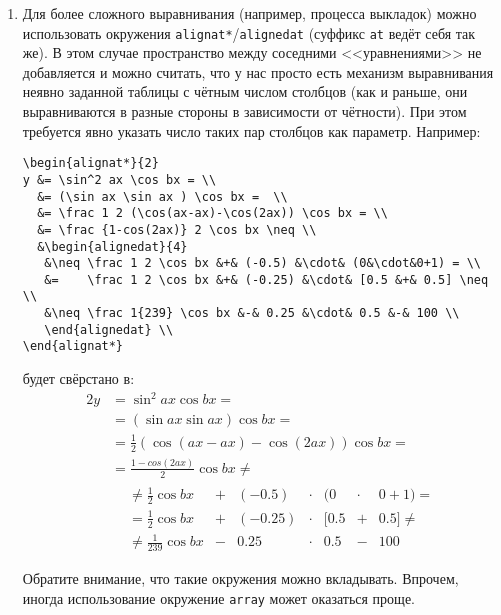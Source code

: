 \documentclass[12pt,a4paper]{book}
\begin{document}
\begin{enumerate}
\item
	Для более сложного выравнивания (например, процесса выкладок) можно использовать
	окружения \texttt{alignat*}/\texttt{alignedat} (суффикс \texttt{at} ведёт себя так же).
	В этом случае пространство между соседними <<уравнениями>> не добавляется и можно
	считать, что у нас просто есть механизм выравнивания неявно заданной таблицы с чётным
	числом столбцов (как и раньше, они выравниваются в разные стороны в зависимости от чётности).
	При этом требуется явно указать число таких пар столбцов как параметр.
	Например:
\begin{verbatim}
\begin{alignat*}{2}
y &= \sin^2 ax \cos bx = \\
  &= (\sin ax \sin ax ) \cos bx =  \\
  &= \frac 1 2 (\cos(ax-ax)-\cos(2ax)) \cos bx = \\
  &= \frac {1-cos(2ax)} 2 \cos bx \neq \\
  &\begin{alignedat}{4}
   &\neq \frac 1 2 \cos bx &+& (-0.5) &\cdot& (0&\cdot&0+1) = \\
   &=    \frac 1 2 \cos bx &+& (-0.25) &\cdot& [0.5 &+& 0.5] \neq \\
   &\neq \frac 1{239} \cos bx &-& 0.25 &\cdot& 0.5 &-& 100 \\
   \end{alignedat} \\
\end{alignat*}
\end{verbatim}
будет свёрстано в:
\begin{alignat*}{2}
y &= \sin^2 ax \cos bx = \\
  &= (\sin ax \sin ax ) \cos bx =  \\
  &= \frac 1 2 (\cos(ax-ax)-\cos(2ax)) \cos bx = \\
  &= \frac {1-cos(2ax)} 2 \cos bx \neq \\
  &\begin{alignedat}{4}
   &\neq \frac 1 2 \cos bx &+& (-0.5) &\cdot& (0&\cdot&0+1) = \\
   &=    \frac 1 2 \cos bx &+& (-0.25) &\cdot& [0.5 &+& 0.5] \neq \\
   &\neq \frac 1{239} \cos bx &-& 0.25 &\cdot& 0.5 &-& 100 \\
   \end{alignedat} \\
\end{alignat*}
	Обратите внимание, что такие окружения можно вкладывать.
	Впрочем, иногда использование окружение \texttt{array} может оказаться проще.
\end{enumerate}
\end{document}

